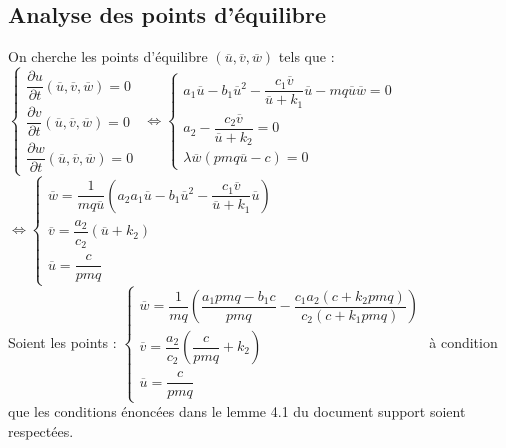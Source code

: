 \documentclass[a4paper, 11pt]{report}%
\begin{document}
        \subsection{Analyse des points d'équilibre}
        On cherche les points d'équilibre $  \left( \overline{u},  \overline{v}, \overline{w} \right)$ tels que :\\
        $ \left\{
            \begin{array}{ll}
                \dfrac{\partial u}{\partial t} \left( \overline{u},  \overline{v}, \overline{w} \right) =0 \\
                \dfrac{\partial v}{\partial t} \left( \overline{u},  \overline{v}, \overline{w} \right) = 0\\
                \dfrac{\partial w}{\partial t}  \left( \overline{u},  \overline{v}, \overline{w} \right) = 0
            \end{array}
        \right.$
        $ \Leftrightarrow \left\{ 
        	\begin{array}{ll}
                a_1 \overline{u} - b_1 \overline{u}^2 - \dfrac{c_1 \overline{v}}{\overline{u} + k_1} \overline{u} - mq \overline{u} \overline{w} =0 \\
                a_2 - \dfrac{c_2 \overline{v}}{\overline{u} + k_2} = 0\\
                \lambda \overline{w} \left( pmq \overline{u} - c \right) = 0
            \end{array}
        \right.$
        $ \Leftrightarrow \left\{ 
        	\begin{array}{ll}
                \overline{w} =  \dfrac{1}{mq \overline{u}} \left(a_2 a_1 \overline{u} - b_1 \overline{u}^2 - \dfrac{c_1 \overline{v}}{\overline{u} + k_1} \overline{u} \right)\\
                \overline{v} = \dfrac{a_2}{c_2} \left( \overline{u} + k_2 \right)\\
                \overline{u} = \dfrac{c}{pmq}
            \end{array}
        \right.$
        \\
            Soient les points :
            $\left\{ 
        	\begin{array}{ll}
                \overline{w} = \dfrac{1}{mq} \left(  \dfrac{a_1pmq-b_1c}{pmq} - \dfrac{c_1a_2(c+k_2pmq)}{c_2(c+k_1pmq)}    \right)\\
                \overline{v} =  \dfrac{a_2}{c_2} \left( \dfrac{c}{pmq} + k_2 \right)\\
                \overline{u} = \dfrac{c}{pmq}
            \end{array}
        \right.$
        à condition que les conditions énoncées dans le lemme 4.1 du document support soient respectées.
        
\end{document}
